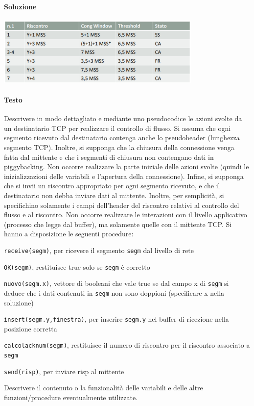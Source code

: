 \documentclass[10pt]{article}
\begin{document}
\paragraph{Soluzione} 
\begin{center}
\includegraphics[scale=1]{es_tcp9testo.png}
\end{center}
\pagebreak
\paragraph{Testo} Descrivere in modo dettagliato e mediante uno pseudocodice le azioni svolte da un destinatario TCP per realizzare il controllo di flusso. Si assuma che ogni segmento ricevuto dal destinatario contenga anche lo pseudoheader (lunghezza segmento TCP). Inoltre, si supponga che la chiusura della connessione venga fatta dal mittente e che i segmenti di chiusura non contengano dati in piggybacking. Non occorre realizzare la parte iniziale delle azioni svolte (quindi le inizializzazioni delle variabili e l’apertura della connessione). Infine, si supponga che si invii un riscontro appropriato per ogni segmento ricevuto, e che il destinatario non debba inviare dati al mittente. Inoltre, per semplicità, si specifichino solamente i campi dell’header del riscontro relativi al controllo del flusso e al riscontro. Non occorre realizzare le interazioni con il livello applicativo (processo che legge dal buffer), ma solamente quelle con il mittente TCP. Si hanno a disposizione le seguenti procedure:
\begin{list}{}{}
\item \texttt{receive(segm)}, per ricevere il segmento \texttt{segm} dal livello di rete
\item \texttt{OK(segm)}, restituisce true solo se \texttt{segm} è corretto
\item \texttt{nuovo(segm.x)}, vettore di booleani che vale true se dal campo x di \texttt{segm} si deduce che i dati contenuti in \texttt{segm} non sono doppioni (specificare x nella soluzione)
\item \texttt{insert(segm.y,finestra)}, per inserire \texttt{segm.y} nel buffer di ricezione nella posizione corretta
\item \texttt{calcolacknum(segm)}, restituisce il numero di riscontro per il riscontro associato a \texttt{segm}
\item \texttt{send(risp)}, per inviare risp al mittente
\end{list}
Descrivere il contenuto o la funzionalità delle variabili e delle altre funzioni/procedure eventualmente utilizzate.
\end{document}
